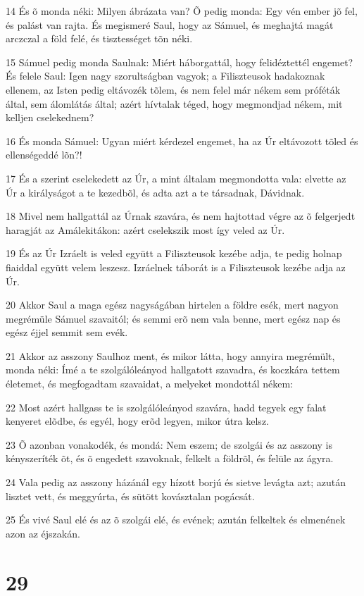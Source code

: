\par 14 És õ monda néki: Milyen ábrázata van? Õ pedig monda: Egy vén ember jõ fel, és palást van rajta. És megismeré Saul, hogy az Sámuel, és meghajtá magát arczczal a föld felé, és tisztességet tõn néki.
\par 15 Sámuel pedig monda Saulnak: Miért háborgattál, hogy felidéztettél engemet? És felele Saul: Igen nagy szorultságban vagyok; a Filiszteusok hadakoznak ellenem, az Isten pedig eltávozék tõlem, és nem felel már nékem sem próféták által, sem álomlátás által; azért hívtalak téged, hogy megmondjad nékem, mit kelljen cselekednem?
\par 16 És monda Sámuel: Ugyan miért kérdezel engemet, ha az Úr eltávozott tõled és ellenségeddé lõn?!
\par 17 És a szerint cselekedett az Úr, a mint általam megmondotta vala: elvette az Úr a királyságot a te kezedbõl, és adta azt a te társadnak, Dávidnak.
\par 18 Mivel nem hallgattál az Úrnak szavára, és nem hajtottad végre az õ felgerjedt haragját az Amálekitákon: azért cselekszik most így veled az Úr.
\par 19 És az Úr Izráelt is veled együtt a Filiszteusok kezébe adja, te pedig holnap fiaiddal együtt velem leszesz. Izráelnek táborát is a Filiszteusok kezébe adja az Úr.
\par 20 Akkor Saul a maga egész nagyságában hirtelen a földre esék, mert nagyon megrémüle Sámuel szavaitól; és semmi erõ nem vala benne, mert egész nap és egész éjjel semmit sem evék.
\par 21 Akkor az asszony Saulhoz ment, és mikor látta, hogy annyira megrémült, monda néki: Ímé a te szolgálóleányod hallgatott szavadra, és koczkára tettem életemet, és megfogadtam szavaidat, a melyeket mondottál nékem:
\par 22 Most azért hallgass te is szolgálóleányod szavára, hadd tegyek egy falat kenyeret elõdbe, és egyél, hogy erõd legyen, mikor útra kelsz.
\par 23 Õ azonban vonakodék, és mondá: Nem eszem; de szolgái és az asszony is kényszeríték õt, és õ engedett szavoknak, felkelt a földrõl, és felüle az ágyra.
\par 24 Vala pedig az asszony házánál egy hízott borjú és sietve levágta azt; azután lisztet vett, és meggyúrta, és sütött kovásztalan pogácsát.
\par 25 És vivé Saul elé és az õ szolgái elé, és evének; azután felkeltek és elmenének azon az éjszakán.

\chapter{29}


